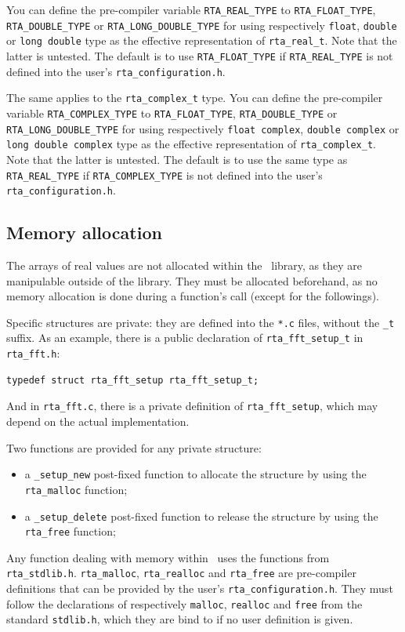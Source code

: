 \documentclass[a4paper, twoside]{article}
\begin{document}
You can define the pre-compiler variable \texttt{RTA\_REAL\_TYPE} to
\texttt{RTA\_FLOAT\_TYPE}, \texttt{RTA\_DOUBLE\_TYPE} or
\texttt{RTA\_LONG\_DOUBLE\_TYPE} for using respectively
\texttt{float}, \texttt{double} or \texttt{long double} type as the
effective representation of \texttt{rta\_real\_t}. Note that the
latter is untested. The default is to use \texttt{RTA\_FLOAT\_TYPE} if
\texttt{RTA\_REAL\_TYPE} is not defined into the user's
\texttt{rta\_configuration.h}.

The same applies to the \texttt{rta\_complex\_t} type. You can define
the pre-compiler variable \texttt{RTA\_COMPLEX\_TYPE} to
\texttt{RTA\_FLOAT\_TYPE}, \texttt{RTA\_DOUBLE\_TYPE} or
\texttt{RTA\_LONG\_DOUBLE\_TYPE} for using respectively \texttt{float
  complex}, \texttt{double complex} or \texttt{long double complex}
type as the effective representation of \texttt{rta\_complex\_t}. Note
that the latter is untested. The default is to use the same type as
\texttt{RTA\_REAL\_TYPE} if \texttt{RTA\_COMPLEX\_TYPE} is not defined
into the user's \texttt{rta\_configuration.h}.


\subsection{Memory allocation}
\label{sec:memory_allocation}

The arrays of real values are not allocated within the \rta\ library,
as they are manipulable outside of the library. They must be allocated
beforehand, as no memory allocation is done during a function's call
(except for the followings).

Specific structures are private: they are defined into the \texttt{*.c}
files, without the \texttt{\_t} suffix. As an example, there is a
public declaration of \texttt{rta\_fft\_setup\_t} in
\texttt{rta\_fft.h}:
\begin{verbatim}
typedef struct rta_fft_setup rta_fft_setup_t;
\end{verbatim}
And in \texttt{rta\_fft.c}, there is a private definition of
\texttt{rta\_fft\_setup}, which may depend on the actual
implementation.

Two functions are provided for any private structure:
\begin{itemize}
\item a \texttt{\_setup\_new} post-fixed function to allocate the
  structure by using the \texttt{rta\_malloc} function;
\item a \texttt{\_setup\_delete} post-fixed function to release the
  structure by using the \texttt{rta\_free} function;
\end{itemize}

Any function dealing with memory within \rta\ uses the functions from
\texttt{rta\_stdlib.h}. \texttt{rta\_malloc}, \texttt{rta\_realloc}
and \texttt{rta\_free} are pre-compiler definitions that can be
provided by the user's \texttt{rta\_configuration.h}. They must
follow the declarations of respectively \texttt{malloc},
\texttt{realloc} and \texttt{free} from the standard
\texttt{stdlib.h}, which they are bind to if no user definition is
given.
\end{document}
